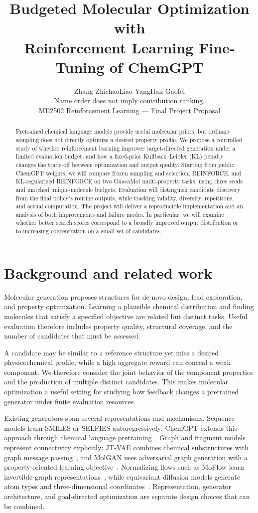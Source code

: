 \documentclass{article}
\title{Budgeted Molecular Optimization with\\
Reinforcement Learning Fine-Tuning of ChemGPT}
\author{%
  Zhang Zhichao\qquad Liao Yang\qquad Han Gaofei\\[0.3em]
  {\footnotesize Name order does not imply contribution ranking.}\\[0.4em]
  {\small ME2502 Reinforcement Learning --- Final Project Proposal}
}
\begin{document}
\maketitle

\begin{abstract}
Pretrained chemical language models provide useful molecular priors, but ordinary
sampling does not directly optimize a desired property profile. We propose a
controlled study of whether reinforcement learning improves target-directed
generation under a limited evaluation budget, and how a fixed-prior
Kullback--Leibler (KL) penalty changes the trade-off between optimization and
output quality. Starting from public ChemGPT weights, we will compare frozen
sampling and selection, REINFORCE, and KL-regularized REINFORCE on two GuacaMol
multi-property tasks, using three seeds and matched unique-molecule budgets.
Evaluation will distinguish candidate discovery from the final policy's routine
outputs, while tracking validity, diversity, repetitions, and actual computation.
The project will deliver a reproducible implementation and an analysis of both
improvements and failure modes. In particular, we will examine whether better
search scores correspond to a broadly improved output distribution or to
increasing concentration on a small set of candidates.
\end{abstract}

\section{Background and related work}
Molecular generation proposes structures for de novo design, lead exploration,
and property optimization. Learning a plausible chemical distribution and
finding molecules that satisfy a specified objective are related but distinct
tasks. Useful evaluation therefore includes property quality, structural
coverage, and the number of candidates that must be assessed.

A candidate may be similar to a reference structure yet miss a desired
physicochemical profile, while a high aggregate reward can conceal a weak
component. We therefore consider the joint behavior of the component properties
and the production of multiple distinct candidates. This makes molecular
optimization a useful setting for studying how feedback changes a pretrained
generator under finite evaluation resources.

Existing generators span several representations and mechanisms. Sequence
models learn SMILES or SELFIES autoregressively; ChemGPT extends this approach
through chemical language pretraining~\citep{frey2023scaling}.
Graph and fragment models represent connectivity explicitly: JT-VAE combines
chemical substructures with graph message passing~\citep{jin2018junction}, and
MolGAN uses adversarial graph generation with a property-oriented learning
objective~\citep{decao2018molgan}. Normalizing flows such as MoFlow learn
invertible graph representations~\citep{zang2020moflow}, while equivariant
diffusion models generate atom types and three-dimensional
coordinates~\citep{hoogeboom2022edm}. Representation, generator architecture,
and goal-directed optimization are separate design choices that can be combined.
\end{document}
